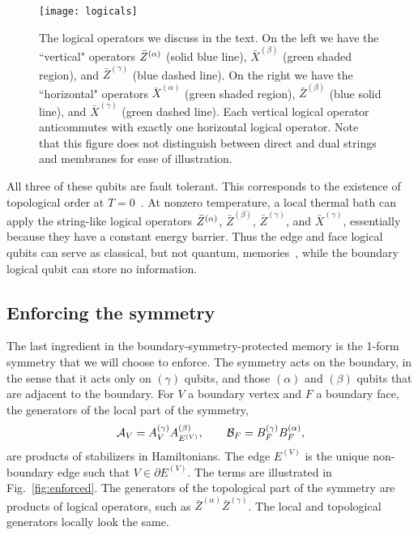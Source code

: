 \begin{figure}[th!]
    \centering
    \texttt{[image: logicals]}
    \caption[The logical operators we discuss in the text]{The logical operators we discuss in the text. On the left we have the ``vertical" operators $\Bar{Z}^{(\alpha)}$ (solid blue line), $\bar{X}^{(\beta)}$ (green shaded region), and $\bar{Z}^{(\gamma)}$ (blue dashed line). On the right we have the ``horizontal" operators $\bar{X}^{(\alpha)}$ (green shaded region), $\bar{Z}^{(\beta)}$ (blue solid line), and $\bar{X}^{(\gamma)}$ (green dashed line). Each vertical logical operator anticommutes with exactly one horizontal logical operator. Note that this figure does not distinguish between direct and dual strings and membranes for ease of illustration.}
    \label{fig:logicals}
\end{figure}

All three of these qubits are fault tolerant. This corresponds to the existence of topological order at $T=0$~\cite{Kitaev2003Fault}. At nonzero temperature, a local thermal bath can apply the string-like logical operators $\Bar{Z}^{(\alpha)}$, $\bar{Z}^{(\beta)}$, $\bar{Z}^{(\gamma)}$, and $\bar{X}^{(\gamma)}$, essentially because they have a constant energy barrier. Thus the edge and face logical qubits can serve as classical, but not quantum, memories~\cite{CastelnovoChamon2008}, while the boundary logical qubit can store no information.

\subsection{Enforcing the symmetry} \label{sub:symm}

The last ingredient in the boundary-symmetry-protected memory is the 1-form symmetry that we will choose to enforce. The symmetry acts on the boundary, in the sense that it acts only on $(\gamma)$ qubits, and those $(\alpha)$ and $(\beta)$ qubits that are adjacent to the boundary. For $V$ a boundary vertex and $F$ a boundary face, the generators of the local part of the symmetry,
\begin{align}
\cal{A}_V = A_V^{(\gamma)} A_{E^{(V)}}^{(\beta)}, \qquad \cal{B}_F = B_F^{(\gamma)}B_F^{(\alpha)}, \label{eqn:sym}
\end{align}
are products of stabilizers in Hamiltonians. The edge $E^{(V)}$ is the unique non-boundary edge such that $V\in\partial E^{(V)}$.  The terms are illustrated in Fig.~\ref{fig:enforced}. The generators of the topological part of the symmetry are products of logical operators, such as $\bar{Z}^{(\alpha)}\bar{Z}^{(\gamma)}$. The local and topological generators locally look the same.

